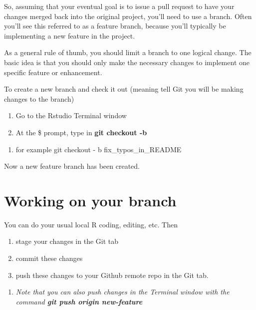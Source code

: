 \documentclass[
]{book}
\providecommand{\tightlist}{%
  \setlength{\itemsep}{0pt}\setlength{\parskip}{0pt}}
\begin{document}
So, assuming that your eventual goal is to issue a pull request to have your changes merged back into the original project, you'll need to use a branch. Often you'll see this referred to as a feature branch, because you'll typically be implementing a new feature in the project.

As a general rule of thumb, you should limit a branch to one logical change. The basic idea is that you should only make the necessary changes to implement one specific feature or enhancement.

To create a new branch and check it out (meaning tell Git you will be making changes to the branch)

\begin{enumerate}
\def\labelenumi{\arabic{enumi}.}
\tightlist
\item
  Go to the Rstudio Terminal window
\item
  At the \$ prompt, type in \textbf{git checkout -b }
\end{enumerate}

\begin{enumerate}
\def\labelenumi{\roman{enumi})}
\tightlist
\item
  for example git checkout - b fix\_typos\_in\_README
\end{enumerate}

Now a new feature branch has been created.

\hypertarget{working-on-your-branch}{%
\section{Working on your branch}\label{working-on-your-branch}}

You can do your usual local R coding, editing, etc.
Then

\begin{enumerate}
\def\labelenumi{\arabic{enumi}.}
\tightlist
\item
  stage your changes in the Git tab
\item
  commit these changes
\item
  push these changes to your Github remote repo in the Git tab.
\end{enumerate}

\begin{enumerate}
\def\labelenumi{\roman{enumi})}
\tightlist
\item
  \emph{Note that you can also push changes in the Terminal window with the command \textbf{git push origin new-feature}}
\end{enumerate}
\end{document}
